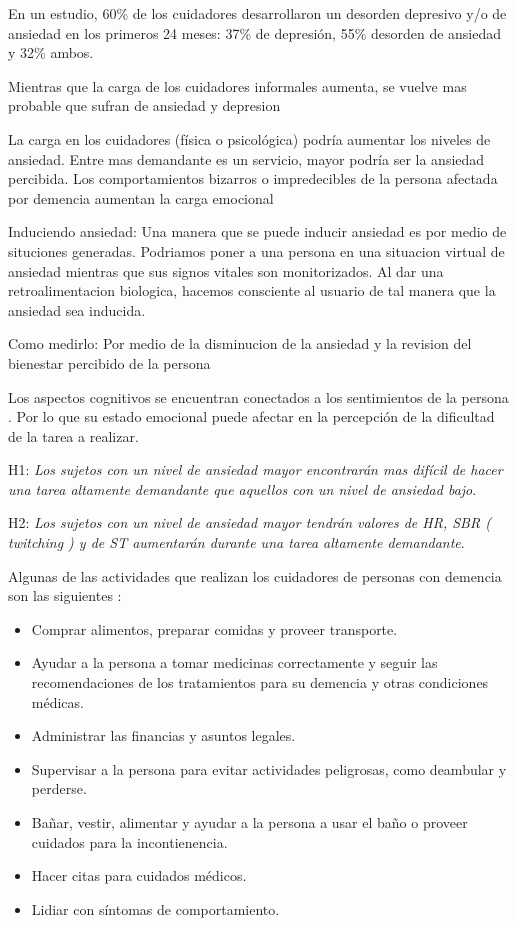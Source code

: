 \documentclass[letterpaper,12pt]{cicese}
\begin{document}
	
	
		En un estudio, 60\% de los cuidadores desarrollaron un desorden depresivo y/o de ansiedad en los primeros 24 meses: 37\% de depresi\'on, 55\% desorden de ansiedad y 32\% ambos. \citep{Joling2014}


		Mientras que la carga de los cuidadores informales aumenta, se vuelve mas probable que sufran de ansiedad y depresion \citep{Denno20131731}

		La carga en los cuidadores (f\'isica o psicol\'ogica) podr\'ia aumentar los niveles de ansiedad. Entre mas demandante es un servicio, mayor podr\'ia ser la ansiedad percibida. Los comportamientos bizarros o impredecibles de la persona afectada por demencia aumentan la carga emocional \citep{Rosa201054}

		Induciendo ansiedad: Una manera que se puede inducir ansiedad es por medio de situciones generadas. Podriamos poner a una persona en una situacion virtual de ansiedad mientras que sus signos
		vitales son monitorizados. Al dar una retroalimentacion biologica, hacemos consciente al usuario de tal manera que la ansiedad sea inducida.

		Como medirlo: Por medio de la disminucion de la ansiedad y la revision del bienestar percibido de la persona
		
		Los aspectos cognitivos se encuentran conectados a los sentimientos de la persona \citep{Wilt2011987}. Por lo que su estado emocional puede afectar en la percepci\'on de la dificultad de la tarea a realizar.

		H1: \textit{Los sujetos con un nivel de ansiedad mayor encontrar\'an mas dif\'icil de hacer una tarea altamente demandante que aquellos con un nivel de ansiedad bajo}.
		

		H2: \textit{Los sujetos con un nivel de ansiedad mayor tendr\'an valores de HR, SBR ( twitching ) y  de ST aumentar\'an durante una tarea altamente demandante}.
		\newpage
	
		Algunas de las actividades que realizan los cuidadores de personas con demencia son las siguientes \citep{tagkey2008110}: 
		\begin{itemize}
			\item Comprar alimentos, preparar comidas y proveer transporte.
			\item Ayudar a la persona a tomar medicinas correctamente y seguir las recomendaciones de los tratamientos para su demencia y otras condiciones m\'edicas.
			\item Administrar las financias y asuntos legales.
			\item Supervisar a la persona para evitar actividades peligrosas, como deambular y perderse.	
			\item Ba\~nar, vestir, alimentar y ayudar a la persona a usar el ba\~no o proveer cuidados para la incontienencia.
			\item Hacer citas para cuidados m\'edicos.
			\item Lidiar con s\'intomas de comportamiento.

		\end{itemize}
        {\normalsize
		
                
        }
\end{document}
